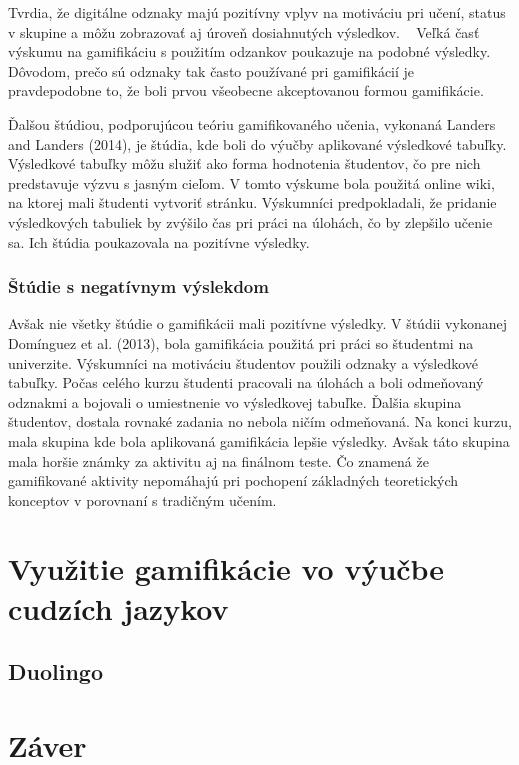 \documentclass[10pt,oneside,slovak,a4paper]{article}
\begin{document}
Tvrdia, že digitálne odznaky majú pozitívny vplyv na motiváciu pri učení, status v skupine a môžu zobrazovať aj úroveň dosiahnutých výsledkov. ~\cite{gibson2015digital} Veľká časť výskumu na gamifikáciu s použitím odzankov poukazuje na podobné výsledky. Dôvodom, prečo sú odznaky tak často používané pri gamifikácií je pravdepodobne to, že boli prvou všeobecne akceptovanou formou gamifikácie. ~\cite{garland2015gamification}

Ďalšou štúdiou, podporujúcou teóriu gamifikovaného učenia, vykonaná Landers and Landers (2014), je štúdia, kde boli do výučby aplikované výsledkové tabuľky. Výsledkové tabuľky môžu služiť ako forma hodnotenia študentov, čo pre nich predstavuje výzvu s jasným cieľom. V tomto výskume bola použitá online wiki, na ktorej mali študenti vytvoriť stránku. Výskumníci predpokladali, že pridanie výsledkových tabuliek by zvýšilo čas pri práci na úlohách, čo by zlepšilo učenie sa. Ich štúdia poukazovala na pozitívne výsledky.
~\cite{garland2015gamification}

\subsubsection{Štúdie s negatívnym výslekdom} \label{negat}
Avšak nie všetky štúdie o gamifikácii mali pozitívne výsledky. V štúdii vykonanej Domínguez et al. (2013), bola gamifikácia použitá pri práci so študentmi na univerzite. Výskumníci na motiváciu študentov použili odznaky a výsledkové tabuľky. Počas celého kurzu študenti pracovali na úlohách a boli odmeňovaný odznakmi a bojovali o umiestnenie vo výsledkovej tabuľke. Ďalšia skupina študentov, dostala rovnaké zadania no nebola ničím odmeňovaná. Na konci kurzu, mala skupina kde bola aplikovaná gamifikácia lepšie výsledky. Avšak táto skupina mala horšie známky za aktivitu aj na finálnom teste. Čo znamená že gamifikované aktivity nepomáhajú pri pochopení základných teoretických konceptov v porovnaní s tradičným učením. ~\cite{dominguez2013gamifying}
\section{Využitie gamifikácie vo výučbe cudzích jazykov} \label{use}
\subsection{Duolingo} \label{duolingo}

\section{Záver} \label{zaver}


\end{document}
